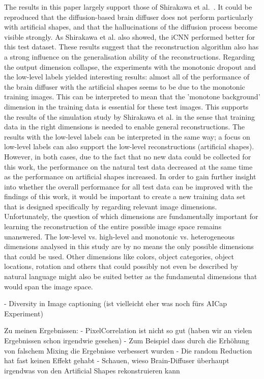 The results in this paper largely support those of Shirakawa et al.~\cite{shirakawaSpuriousReconstructionBrain2024}. It could be reproduced that the diffusion-based brain diffuser does not perform particularly  with artificial shapes, and that the hallucinations of the diffusion process become visible strongly. As Shirakawa et al. also showed, the iCNN performed better for this test dataset. These results suggest that the reconstruction algorithm also has a strong influence on the generalisation ability of the reconstructions. Regarding the output dimension collapse, the experiments with the monotonic dropout and the low-level labels yielded interesting results: almost all of the performance of the brain diffuser with the artificial shapes seems to be due to the monotonic training images. This can be interpreted to mean that the 'monotone background' dimension in the training data is essential for these test images. This supports the results of the simulation study by Shirakawa et al. in the sense that training data in the right dimensions is needed to enable general reconstructions. The results with the low-level labels can be interpreted in the same way; a focus on low-level labels can also support the low-level reconstructions (artificial shapes). However, in both cases, due to the fact that no new data could be collected for this work, the performance on the natural test data decreased at the same time as the performance on artificial shapes increased. In order to gain further insight into whether the overall performance for all test data can be improved with the findings of this work, it would be important to create a new training data set that is designed specifically by regarding relevant image dimensions. Unfortunately, the question of which dimensions are fundamentally important for learning the reconstruction of the entire possible image space remains unanswered. The low-level vs. high-level and monotonic vs. heterogeneous dimensions analysed in this study are by no means the only possible dimensions that could be used. Other dimensions like colors, object categories, object locations, rotation and others that could possibly not even be described by natural language might also be suited better as the fundamental dimensions that would span the image space.

\cite{wangDiversityImageCaptioning2022}
- Diversity in Image captioning (ist vielleicht eher was noch fürs AICap Experiment)

Zu meinen Ergebnissen:
- PixelCorrelation ist nicht so gut (haben wir an vielen Ergebnissen schon irgendwie gesehen)
    - Zum Beispiel dass durch die Erhöhung von falschem Mixing die Ergebnisse verbessert wurden
    - Die random Reduction hat fast keinen Effekt gehabt
    - Schauen, wieso Brain-Diffuser überhaupt irgendwas von den Artificial Shapes rekonstruieren kann


